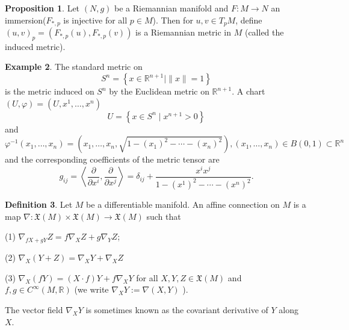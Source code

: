 \documentclass[12pt,a4paper]{book}
\newcommand{\bb}[1]{\mathbb{#1}}
\newcommand{\dd}{\text{d}}
\theoremstyle{definition}
\newtheorem{defn}{Definition}[section]
\newtheorem{prop}[defn]{Proposition}
\newtheorem{exam}[defn]{Example}
\begin{document}
\begin{prop}
    Let $(N, g)$ be a Riemannian manifold and $F: M \rightarrow N$ an immersion($F_{*,p}$ is injective for all $p\in M$).
    Then for $u,v\in T_pM$, define $(u,v)_p=(F_{*,p}(u), F_{*,p}(v))$ is a Riemannian metric in $M$ (called the induced metric).
\end{prop}
\begin{exam}
    The standard metric on
    $$
        S^n=\left\{x \in \mathbb{R}^{n+1} \mid\|x\|=1\right\}
    $$
    is the metric induced on $S^n$ by the Euclidean metric on $\mathbb{R}^{n+1}$. A chart $(U,\varphi)=(U,x^1,\dots,x^n)$
    $$
        U=\left\{x \in S^n \mid x^{n+1}>0\right\}
    $$
    and
    $$
        \varphi^{-1}\left(x_1, \ldots, x_n\right)=\left(x_1, \ldots, x_n, \sqrt{1-\left(x_1\right)^2-\cdots-\left(x_n\right)^2}\right), (x_1,\dots,x_n)\in B(0,1)\subset \bb{R}^n
    $$
    and the corresponding coefficients of the metric tensor are
    $$
        g_{i j}=\left\langle\frac{\partial}{\partial x^i}, \frac{\partial }{\partial x^j}\right\rangle=\delta_{i j}+\frac{x^i x^j}{1-\left(x^1\right)^2-\cdots-\left(x^n\right)^2} .
    $$
\end{exam}
\begin{defn}
    Let $M$ be a differentiable manifold. An affine connection on $M$ is a map $\nabla: \mathfrak{X}(M) \times \mathfrak{X}(M) \rightarrow \mathfrak{X}(M)$ such that

    (1) $\nabla_{f X+g Y} Z=f \nabla_X Z+g \nabla_Y Z$;

    (2) $\nabla_X(Y+Z)=\nabla_X Y+\nabla_X Z$

    (3) $\nabla_X(f Y)=(X \cdot f) Y+f \nabla_X Y$
    for all $X, Y, Z \in \mathfrak{X}(M)$ and $f, g \in C^{\infty}(M, \mathbb{R})$ (we write $\nabla_X Y:=\nabla(X, Y)$ ).

    The vector field $\nabla_X Y$ is sometimes known as the covariant derivative of $Y$ along $X$.
\end{defn}
\end{document}
